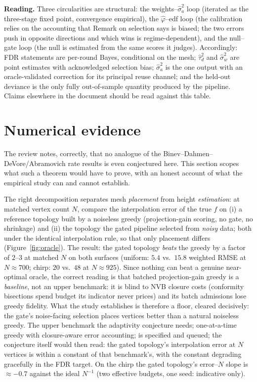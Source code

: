 \documentclass[11pt]{article}
\begin{document}
\medskip
\noindent\textbf{Reading.} Three circularities are structural: the
weights--$\hat\sigma_a^2$ loop (iterated as the three-stage fixed point,
convergence empirical), the $\hat\varphi$--edf loop (the calibration relies
on the accounting that Remark on selection says is biased; the two errors
push in opposite directions and which wins is regime-dependent), and the
null--gate loop (the null is estimated from the same scores it judges).
Accordingly: FDR statements are per-round Bayes, conditional on the mesh;
$\hat\tau_d^2$ and $\hat\sigma_w^2$ are point estimates with acknowledged
selection bias; $\hat\sigma_a^2$ is the one output with an
oracle-validated correction for its principal reuse channel; and the
held-out deviance is the only fully out-of-sample quantity produced by the
pipeline. Claims elsewhere in the document should be read against this
table.

\section{Numerical evidence}\label{sec:numerics}
\label{sec:oracle}

The review notes, correctly, that no analogue of the
Binev--Dahmen--DeVore/Abramovich rate results is even conjectured here. This
section scopes what such a theorem would have to prove, with an honest
account of what the empirical study can and cannot establish.

The right decomposition separates mesh \emph{placement} from height
\emph{estimation}: at matched vertex count $N$, compare the interpolation
error of the true $f$ on (i) a reference topology built by a noiseless
greedy (projection-gain scoring, no gate, no shrinkage) and (ii) the
topology the gated pipeline selected from \emph{noisy} data; both under
the identical interpolation rule, so that only placement differs
(Figure~\ref{fig:oracle}). The result: the gated topology \emph{beats} the
greedy by a factor of $2$--$3$ at matched $N$ on both surfaces
(uniform: $5.4$ vs.\ $15.8$ weighted RMSE at $N\!\approx\!700$; chirp:
$20$ vs.\ $48$ at $N\!\approx\!925$). Since nothing can beat a genuine
near-optimal oracle, the correct reading is that batched projection-gain
greedy is a \emph{baseline}, not an upper benchmark: it is blind to NVB
closure costs (conformity bisections spend budget its indicator never
prices) and its batch admissions lose greedy fidelity. What the study
establishes is therefore a floor, cleared decisively: the gate's
noise-facing selection places vertices better than a natural noiseless
greedy. The upper benchmark the adaptivity conjecture needs; one-at-a-time
greedy with closure-aware error accounting; is specified and queued; the
conjecture itself would then read: the gated topology's interpolation error
at $N$ vertices is within a constant of that benchmark's, with the constant
degrading gracefully in the FDR target. On the chirp the gated topology's
error--$N$ slope is $\approx-0.7$ against the ideal $N^{-1}$ (two effective
budgets, one seed: indicative only).
\end{document}
